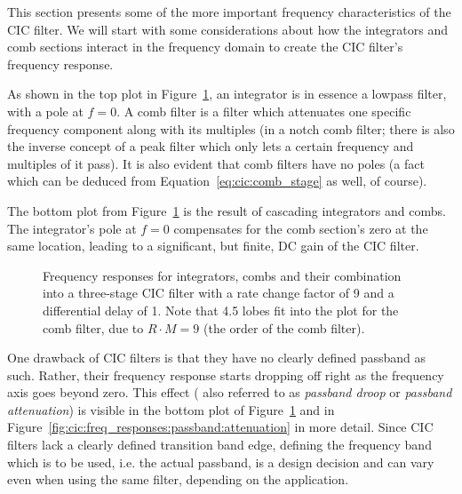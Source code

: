 This section presents some of  the more important frequency characteristics of
the  CIC  filter. We  will  start  with  some  considerations  about  how  the
integrators and comb  sections interact in the frequency domain  to create the
CIC filter's frequency response.

As shown in the top plot in Figure~\ref{fig:cic:freq_responses}, an integrator
is in essence  a lowpass filter, with a pole  at $f = 0$.  A comb  filter is a
filter  which  attenuates one  specific  frequency  component along  with  its
multiples (in a notch comb filter; there is also the inverse concept of a peak
filter which only lets  a certain frequency and multiples of  it pass).  It is
also evident that comb filters have no poles (a fact which can be deduced from
Equation~\ref{eq:cic:comb_stage} as well, of course).

The  bottom plot  from  Figure~\ref{fig:cic:freq_responses} is  the result  of
cascading integrators and combs.  The integrator's pole at $f = 0$ compensates
for the  comb section's zero at  the same location, leading  to a significant,
but finite, DC gain of the CIC filter.

\begin{figure}
    \centering
        
        \caption[Frequency Responses for Integrators, Combs and CIC Filters]{%
            Frequency responses  for integrators, combs and  their combination
            into a three-stage CIC filter with a rate change factor of \num{9}
            and a  differential delay of  \num{1}.  Note that  \num{4.5} lobes
            fit into the plot for the comb  filter, due to $R\cdot M = 9$ (the
            order of the  comb filter).%
        }
        \label{fig:cic:freq_responses}
\end{figure}


One  drawback   of  CIC  filters  is   that  they  have  no   clearly  defined
passband  as  such. Rather,  their  frequency  response  starts  dropping  off
right  as   the  frequency   axis  goes  beyond   zero. This  effect   (  also
referred  to  as  \emph{passband  droop} or  \emph{passband  attenuation})  is
visible  in  the bottom  plot  of  Figure~\ref{fig:cic:freq_responses} and  in
Figure~\ref{fig:cic:freq_responses:passband:attenuation} in more detail. Since
CIC  filters  lack  a  clearly  defined transition  band  edge,  defining  the
frequency band  which is  to be used,  i.e. the actual  passband, is  a design
decision  and can  vary even  when  using the  same filter,  depending on  the
application.

